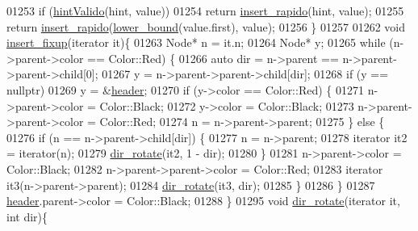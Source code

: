 \begin{DoxyCode}
01253         \textcolor{keywordflow}{if} (\hyperlink{classaed2_1_1map_a45b04533e9acf27438813ab4a2604443_a45b04533e9acf27438813ab4a2604443}{hintValido}(hint, value))
01254             \textcolor{keywordflow}{return} \hyperlink{classaed2_1_1map_a4b4f1e65ee9aeccee4046d53fd5fd8a4_a4b4f1e65ee9aeccee4046d53fd5fd8a4}{insert_rapido}(hint, value);
01255         \textcolor{keywordflow}{return} \hyperlink{classaed2_1_1map_a4b4f1e65ee9aeccee4046d53fd5fd8a4_a4b4f1e65ee9aeccee4046d53fd5fd8a4}{insert_rapido}(\hyperlink{classaed2_1_1map_a3399d36fdd5a880b494f3a5795d3f18f_a3399d36fdd5a880b494f3a5795d3f18f}{lower_bound}(value.first), value);
01256     \}
01257 
01262     \textcolor{keywordtype}{void} \hyperlink{classaed2_1_1map_ac9197851fe5b217d45d58bbaf3612c75_ac9197851fe5b217d45d58bbaf3612c75}{insert_fixup}(iterator it)\{
01263         Node* n = it.n;
01264         Node* y;
01265         \textcolor{keywordflow}{while} (n->parent->color == Color::Red) \{
01266             \textcolor{keyword}{auto} dir = n->parent == n->parent->parent->child[0];
01267             y = n->parent->parent->child[dir];
01268             \textcolor{keywordflow}{if} (y == \textcolor{keyword}{nullptr})
01269                 y = &\hyperlink{classaed2_1_1map_a92d93f905c8ad73fba18fdc7e8915cce_a92d93f905c8ad73fba18fdc7e8915cce}{header};
01270             \textcolor{keywordflow}{if} (y->color == Color::Red) \{
01271                 n->parent->color = Color::Black;
01272                 y->color = Color::Black;
01273                 n->parent->parent->color = Color::Red;
01274                 n = n->parent->parent;
01275             \} \textcolor{keywordflow}{else} \{
01276                 \textcolor{keywordflow}{if} (n == n->parent->child[dir]) \{
01277                     n = n->parent;
01278                     iterator it2 = iterator(n);
01279                     \hyperlink{classaed2_1_1map_a94f2862ada0c9ed4f4457eac42ea8f23_a94f2862ada0c9ed4f4457eac42ea8f23}{dir_rotate}(it2, 1 - dir);
01280                 \}
01281                     n->parent->color = Color::Black;
01282                     n->parent->parent->color = Color::Red;
01283                     iterator it3(n->parent->parent);
01284                     \hyperlink{classaed2_1_1map_a94f2862ada0c9ed4f4457eac42ea8f23_a94f2862ada0c9ed4f4457eac42ea8f23}{dir_rotate}(it3, dir);
01285             \}
01286         \}
01287         \hyperlink{classaed2_1_1map_a92d93f905c8ad73fba18fdc7e8915cce_a92d93f905c8ad73fba18fdc7e8915cce}{header}.parent->color = Color::Black;
01288     \}
01295     \textcolor{keywordtype}{void} \hyperlink{classaed2_1_1map_a94f2862ada0c9ed4f4457eac42ea8f23_a94f2862ada0c9ed4f4457eac42ea8f23}{dir_rotate}(iterator it, \textcolor{keywordtype}{int} dir)\{

\end{DoxyCode}
